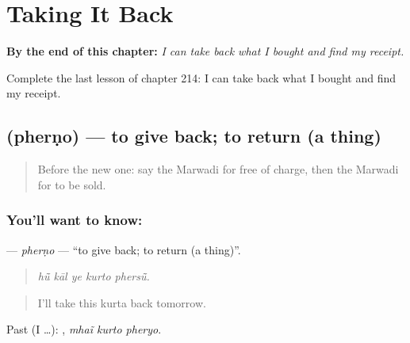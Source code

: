 
\chapter{Taking It Back}
\label{ch:mw-taking-it-back}

\begin{chapteropening}
\textbf{By the end of this chapter:} \emph{I can take back what I bought and find my receipt.}

Complete the last lesson of chapter 214: I can take back what I bought and find my receipt.
\end{chapteropening}

\section[\texorpdfstring{\mw{फेरणो} (pherṇo)}{फेरणो (pherṇo)}]{ (pherṇo) — to give back; to return (a thing)}

\label{lesson:MW-C214-pherno}



\begin{quote}
Before the new one: say the Marwadi for free of charge, then the Marwadi for to be sold.
\end{quote}

\subsection*{You'll want to know: }
\textbf{} — \emph{pherṇo} — \textquotedblleft{}to give back; to return (a thing)\textquotedblright{}.

\begin{quote}
    
\end{quote}

\begin{quote}
\emph{hū̃ kāl ye kurto phersū̃.}
\end{quote}

\begin{quote}
I'll take this kurta back tomorrow.
\end{quote}

Past (I …):   , \emph{mhaĩ kurto pheryo}.

